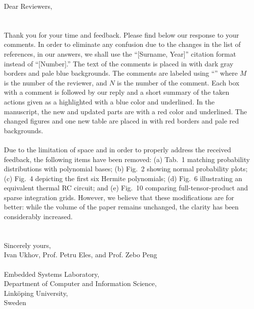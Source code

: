 Dear Reviewers,
\\
\\
\\
\noindent Thank you for your time and feedback.
Please find below our response to your comments.
In order to eliminate any confusion due to the changes in the list of references, in our answers, we shall use the ``[Surname, Year]'' citation format instead of ``[Number].''
The text of the comments is placed in  with dark gray borders and pale blue backgrounds.
The comments are labeled using ``'' where $M$ is the number of the reviewer, and $N$ is the number of the comment.
Each box with a comment is followed by our reply and a short summary of the taken actions given as a  highlighted with a blue color and underlined.
In the manuscript, the new and updated parts are  with a red color and underlined.
The changed figures and one new table are placed in  with red borders and pale red backgrounds.
\\
\\
Due to the limitation of space and in order to properly address the received feedback, the following items have been removed:
(a) Tab.~1 matching probability distributions with polynomial bases;
(b) Fig.~2 showing normal probability plots;
(c) Fig.~4 depicting the first six Hermite polynomials;
(d) Fig.~6 illustrating an equivalent thermal RC circuit; and
(e) Fig.~10 comparing full-tensor-product and sparse integration grids.
However, we believe that these modifications are for better: while the volume of the paper remains unchanged, the clarity has been considerably increased.
\\
\\
\\
\noindent Sincerely yours,\\
Ivan Ukhov, Prof. Petru Eles, and Prof. Zebo Peng
\\
\\
\noindent Embedded Systems Laboratory,\\
Department of Computer and Information Science,\\
Link\"{o}ping University,\\
Sweden
